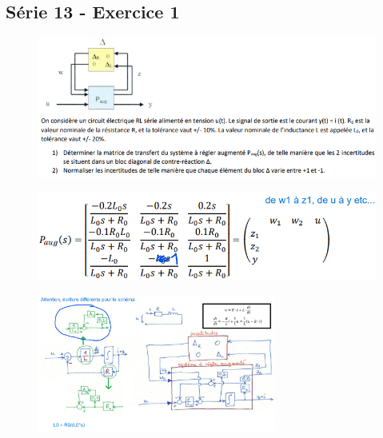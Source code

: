 \documentclass[]{article}
\begin{document}
\subsection{Série 13 - Exercice 1}
\begin{multicols}{2}
\begin{figure}[H]
\centering
\includegraphics[width=\columnwidth]{img_12.png}
\end{figure}
\begin{figure}[H]
\centering
\includegraphics[width=\columnwidth]{img_15.png}
\end{figure}
\end{multicols}
\begin{figure}[H]
\centering
\includegraphics[width=0.7\textwidth]{img_14.png}
\end{figure}
\end{document}
